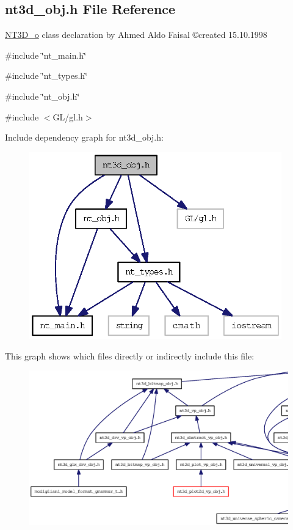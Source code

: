 \subsection{nt3d\_\-obj.h File Reference}
\label{nt3d__obj_8h}



\begin{DoxyItemize}
\item \hyperlink{class_n_t3_d__o}{NT3D\_\-o} class declaration by Ahmed Aldo Faisal \copyright created 15.10.1998 
\end{DoxyItemize} 


{\ttfamily \#include \char`\"{}nt\_\-main.h\char`\"{}}\par
{\ttfamily \#include \char`\"{}nt\_\-types.h\char`\"{}}\par
{\ttfamily \#include \char`\"{}nt\_\-obj.h\char`\"{}}\par
{\ttfamily \#include $<$GL/gl.h$>$}\par
Include dependency graph for nt3d\_\-obj.h:
\nopagebreak
\begin{figure}[H]
\begin{center}
\leavevmode
\includegraphics[width=310pt]{nt3d__obj_8h__incl}
\end{center}
\end{figure}
This graph shows which files directly or indirectly include this file:
\nopagebreak
\begin{figure}[H]
\begin{center}
\leavevmode
\includegraphics[width=400pt]{nt3d__obj_8h__dep__incl}
\end{center}
\end{figure}
